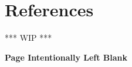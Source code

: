 \section{References}
\label{sec:References}
\textcolor{commentGreen}{*** WIP ***}

\textbf{Page Intentionally Left Blank}

\pagebreak
